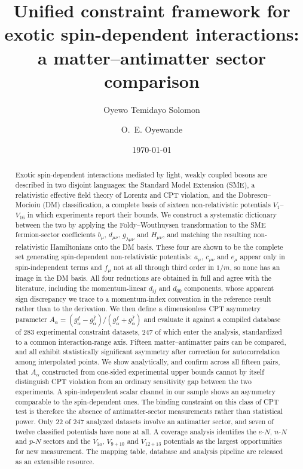 \documentclass[
  aps,
  prd,
  reprint,
  amsmath,
  amssymb,
  nofootinbib,
  superscriptaddress,
  floatfix
]{revtex4-2}
\newcommand{\Aalpha}{A_\alpha}
\begin{document}
\title{Unified constraint framework for exotic spin-dependent
interactions: a matter--antimatter sector comparison}

\author{Oyewo Temidayo Solomon}

\author{O.~E. Oyewande}

\date{\today}

\begin{abstract}
Exotic spin-dependent interactions mediated by light, weakly coupled
bosons are described in two disjoint languages: the Standard Model
Extension (SME), a relativistic effective field theory of Lorentz and CPT
violation, and the Dobrescu--Mocioiu (DM) classification, a complete basis
of sixteen non-relativistic potentials $V_1$--$V_{16}$ in which
experiments report their bounds. We construct a systematic dictionary
between the two by applying the Foldy--Wouthuysen transformation to the SME
fermion-sector coefficients $b_\mu$, $d_{\mu\nu}$, $g_{\lambda\mu\nu}$ and
$H_{\mu\nu}$, and matching the resulting non-relativistic Hamiltonians onto
the DM basis. These four are shown to be the complete set generating
spin-dependent non-relativistic potentials: $a_\mu$, $c_{\mu\nu}$ and
$e_\mu$ appear only in spin-independent terms and $f_\mu$ not at all
through third order in $1/m$, so none has an image in the DM basis. All
four reductions are obtained in full and agree with the literature,
including the
momentum-linear $d_{ij}$ and $d_{00}$ components, whose apparent sign
discrepancy we trace to a momentum-index convention in the reference
result rather than to the derivation. We then define a
dimensionless CPT asymmetry parameter
$\Aalpha=(g_\alpha^{f}-g_\alpha^{\bar f})/(g_\alpha^{f}+g_\alpha^{\bar
f})$ and evaluate it against a compiled database of 283 experimental
constraint datasets, 247 of which enter the analysis, standardized to a
common interaction-range axis.
Fifteen matter--antimatter pairs can be compared, and all exhibit
statistically significant asymmetry after correction for autocorrelation
among interpolated points. We show analytically, and confirm across all
fifteen pairs, that $\Aalpha$ constructed from one-sided experimental upper
bounds cannot by itself distinguish CPT violation from an ordinary
sensitivity gap between the two experiments. A spin-independent scalar
channel in our sample shows an asymmetry comparable to the spin-dependent
ones. The
binding constraint on this class of CPT test is therefore the absence of
antimatter-sector measurements rather than statistical power. Only 22 of
247 analyzed datasets involve an antimatter sector, and seven of twelve
classified potentials have none at all. A coverage analysis identifies the
$e$-$N$, $n$-$N$ and $p$-$N$ sectors and the $V_{1a}$, $V_{9+10}$ and
$V_{12+13}$ potentials as the largest opportunities for new measurement.
The mapping table, database and analysis pipeline are released as an
extensible resource.
\end{abstract}
\end{document}
